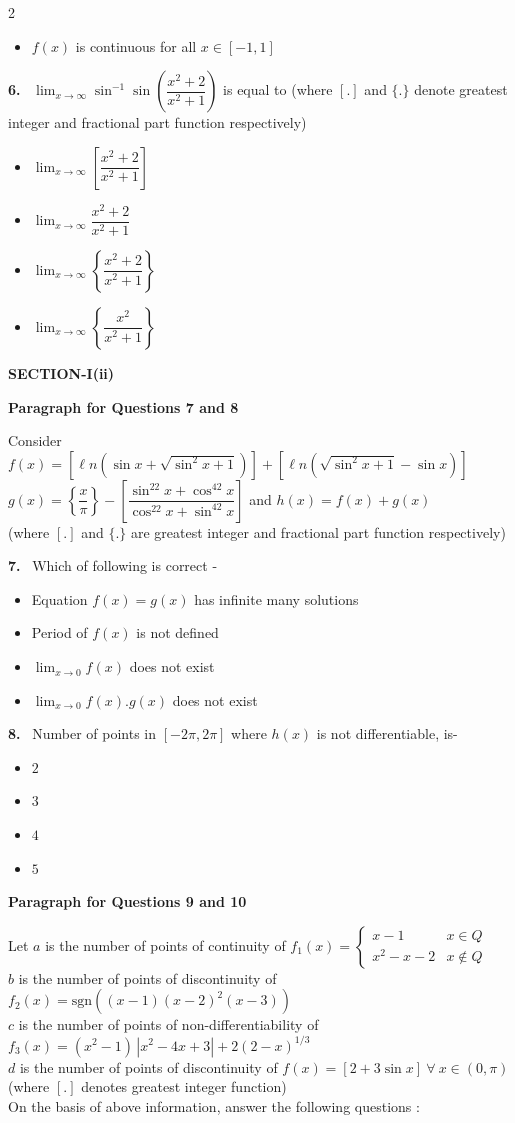 \documentclass[10pt]{extarticle}
\newcommand{\sect}[1]{\par\smallskip\noindent\textbf{#1}\par}
\newcommand{\qn}[1]{\par\smallskip\noindent\textbf{#1.}~}
\newcommand{\paraq}[2]{\par\smallskip\noindent\textbf{Paragraph for Questions #1 and #2}\par}
\newenvironment{qoptions}{\begin{itemize}[leftmargin=1.8em,itemsep=1pt,topsep=2pt,label={}]}{\end{itemize}}
\newcommand{\opt}[2]{\item[(#1)] #2}
\begin{document}
\begin{multicols}{2}
\begin{qoptions}
\opt{D}{$f(x)$ is continuous for all $x\in[-1,1]$}
\end{qoptions}
\qn{6} $\displaystyle\lim_{x\to\infty}\sin^{-1}\sin\left(\dfrac{x^2+2}{x^2+1}\right)$ is equal to (where $[.]$ and $\{.\}$ denote greatest integer and fractional part function respectively)
\begin{qoptions}
\opt{A}{$\displaystyle\lim_{x\to\infty}\left[\dfrac{x^2+2}{x^2+1}\right]$}
\opt{B}{$\displaystyle\lim_{x\to\infty}\dfrac{x^2+2}{x^2+1}$}
\opt{C}{$\displaystyle\lim_{x\to\infty}\left\{\dfrac{x^2+2}{x^2+1}\right\}$}
\opt{D}{$\displaystyle\lim_{x\to\infty}\left\{\dfrac{x^2}{x^2+1}\right\}$}
\end{qoptions}
\sect{SECTION-I(ii)}
\paraq{7}{8}
Consider $f(x)=\left[\ell n\left(\sin x+\sqrt{\sin^2x+1}\right)\right]+\left[\ell n\left(\sqrt{\sin^2x+1}-\sin x\right)\right]$\\
$g(x)=\left\{\dfrac x\pi\right\}-\left[\dfrac{\sin^22x+\cos^42x}{\cos^22x+\sin^42x}\right]$ and $h(x)=f(x)+g(x)$\\
(where $[.]$ and $\{.\}$ are greatest integer and fractional part function respectively)
\qn{7} Which of following is correct -
\begin{qoptions}
\opt{A}{Equation $f(x)=g(x)$ has infinite many solutions}
\opt{B}{Period of $f(x)$ is not defined}
\opt{C}{$\displaystyle\lim_{x\to0}f(x)$ does not exist}
\opt{D}{$\displaystyle\lim_{x\to0}f(x).g(x)$ does not exist}
\end{qoptions}
\qn{8} Number of points in $[-2\pi,2\pi]$ where $h(x)$ is not differentiable, is-
\begin{qoptions}
\opt{A}{$2$}
\opt{B}{$3$}
\opt{C}{$4$}
\opt{D}{$5$}
\end{qoptions}
\paraq{9}{10}
Let $a$ is the number of points of continuity of $f_1(x)=\begin{cases}x-1 & x\in Q\\ x^2-x-2 & x\notin Q\end{cases}$\\
$b$ is the number of points of discontinuity of $f_2(x)=\mathrm{sgn}\left((x-1)(x-2)^2(x-3)\right)$\\
$c$ is the number of points of non-differentiability of $f_3(x)=(x^2-1)\,|x^2-4x+3|+2(2-x)^{1/3}$\\
$d$ is the number of points of discontinuity of $f(x)=[2+3\sin x]\ \forall\ x\in(0,\pi)$\\
(where $[.]$ denotes greatest integer function)\\
On the basis of above information, answer the following questions :

\end{multicols}
\end{document}
